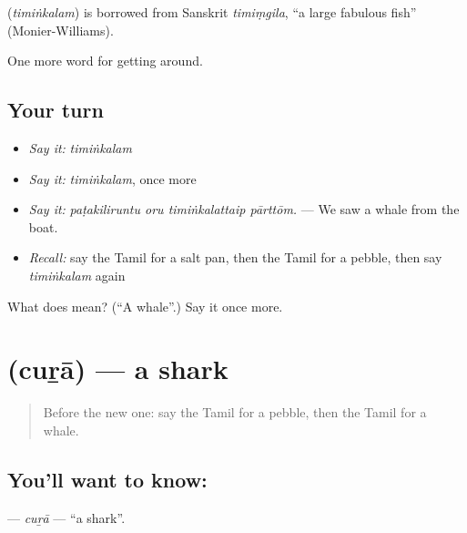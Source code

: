 \begin{cousinweb}
\textbf{} (\emph{timiṅkalam}) is borrowed from Sanskrit \emph{timiṃgila}, \textquotedblleft{}a large fabulous fish\textquotedblright{} (Monier-Williams).
\end{cousinweb}

\begin{grammarlens}[title={What you've built}]
One more word for getting around.
\end{grammarlens}

\subsection*{Your turn}
\begin{itemize}
\raggedright
  \item \emph{Say it:} \emph{timiṅkalam}
  \item \emph{Say it:} \emph{timiṅkalam}, once more
  \item \emph{Say it:} \emph{paṭakiliruntu oru timiṅkalattaip pārttōm.} — We saw a whale from the boat.
  \item \emph{Recall:} say the Tamil for a salt pan, then the Tamil for a pebble, then say \emph{timiṅkalam} again
\end{itemize}

\begin{tcolorbox}[breakable,colback=teal!4,colframe=teal!35!black,title={Before you move on}]
What does  mean? (\textquotedblleft{}A whale\textquotedblright{}.) Say it once more.
\end{tcolorbox}
\section[\texorpdfstring{\ta{சுறா} (cuṟā)}{சுறா (cuṟā)}]{ (cuṟā) — a shark}

\label{lesson:TA-C436-cura}



\begin{quote}
Before the new one: say the Tamil for a pebble, then the Tamil for a whale.
\end{quote}

\subsection*{You'll want to know: }
\textbf{} — \emph{cuṟā} — \textquotedblleft{}a shark\textquotedblright{}.

